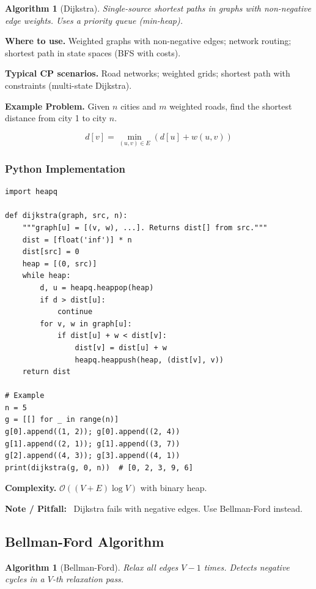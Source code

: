 \documentclass[10pt,a4paper]{article}
\theoremstyle{cpstyle}
\newtheorem{algorithm}[theorem]{Algorithm}
\newenvironment{cpnote}{%
  \begin{mdframed}[backgroundcolor=notebg, linecolor=orange!70, linewidth=1pt,
    innerleftmargin=10pt, innerrightmargin=10pt, innertopmargin=6pt, innerbottommargin=6pt]
  \textbf{\color{orange!80!black}Note / Pitfall:}~}{%
  \end{mdframed}}
\newcommand{\bigO}[1]{\mathcal{O}\!\left(#1\right)}
\begin{document}
\begin{algorithm}[Dijkstra]
Single-source shortest paths in graphs with non-negative edge weights. Uses a priority queue (min-heap).
\end{algorithm}

\textbf{Where to use.} Weighted graphs with non-negative edges; network routing; shortest path in state spaces (BFS with costs).

\textbf{Typical CP scenarios.} Road networks; weighted grids; shortest path with constraints (multi-state Dijkstra).

\textbf{Example Problem.} Given $n$ cities and $m$ weighted roads, find the shortest distance from city 1 to city $n$.

\[
  d[v] = \min_{(u,v)\in E} (d[u] + w(u,v))
\]

\subsubsection{Python Implementation}
\begin{lstlisting}[caption={Dijkstra with heapq}]
import heapq

def dijkstra(graph, src, n):
    """graph[u] = [(v, w), ...]. Returns dist[] from src."""
    dist = [float('inf')] * n
    dist[src] = 0
    heap = [(0, src)]
    while heap:
        d, u = heapq.heappop(heap)
        if d > dist[u]:
            continue
        for v, w in graph[u]:
            if dist[u] + w < dist[v]:
                dist[v] = dist[u] + w
                heapq.heappush(heap, (dist[v], v))
    return dist

# Example
n = 5
g = [[] for _ in range(n)]
g[0].append((1, 2)); g[0].append((2, 4))
g[1].append((2, 1)); g[1].append((3, 7))
g[2].append((4, 3)); g[3].append((4, 1))
print(dijkstra(g, 0, n))  # [0, 2, 3, 9, 6]
\end{lstlisting}

\textbf{Complexity.} $\bigO{(V+E)\log V}$ with binary heap.

\begin{cpnote}
Dijkstra fails with negative edges. Use Bellman-Ford instead.
\end{cpnote}

\subsection{Bellman-Ford Algorithm}

\begin{algorithm}[Bellman-Ford]
Relax all edges $V-1$ times. Detects negative cycles in a $V$-th relaxation pass.
\end{algorithm}
\end{document}
